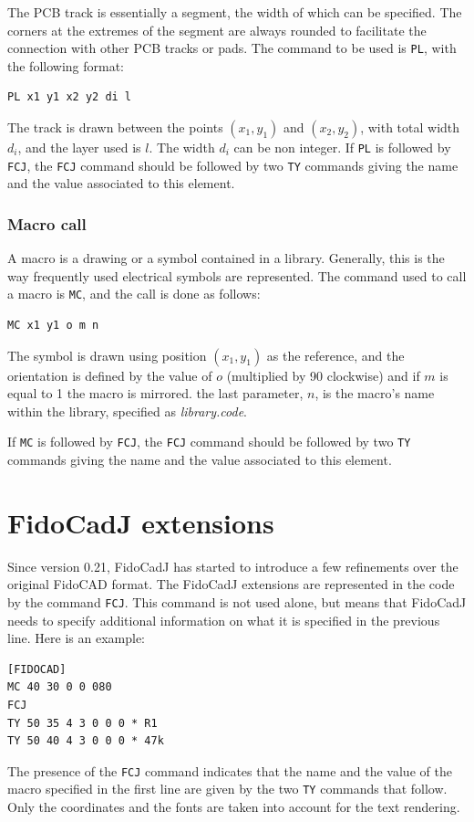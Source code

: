 \documentclass[10pt,a4paper,twoside]{scrreprt}
\begin{document}
The PCB track is essentially a segment, the width
of which can be specified. The corners at the extremes of the segment
are always rounded to facilitate the connection with other PCB tracks
or pads. The command to be used is \lstinline!PL!, with
the following format:
\begin{lstlisting}
PL x1 y1 x2 y2 di l
\end{lstlisting}
The track is drawn between the points $(x_{1},y_{1})$ and $(x_{2},y_{2})$,
with total width $d_{i}$, and the layer used is $l$. The width $d_{i}$ can be non integer.
If \lstinline!PL! is followed by \lstinline!FCJ!, the \lstinline!FCJ! command should be followed by two \lstinline!TY! commands giving the name and the value associated to this element.

\subsubsection{Macro call}

A macro is a drawing or a symbol contained in a library.
Generally, this is the way frequently used electrical symbols are
represented. The command used to call a macro is \lstinline!MC!,
and the call is done as follows:
\begin{lstlisting}
MC x1 y1 o m n
\end{lstlisting}
The symbol is drawn using position $(x_{1},y_{1})$
as the reference, and the orientation is defined by the value of $o$
(multiplied by 90\textdegree{} clockwise) and if $m$ is equal to 1 the macro
is mirrored. the last parameter, $n$, is the macro's name within
the library, specified as \emph{library.code}.

If \lstinline!MC! is followed by \lstinline!FCJ!, the \lstinline!FCJ! command should be followed by two \lstinline!TY! commands giving the name and the value associated to this element.

\section{FidoCadJ extensions}
\label{FCJ_extension}
Since version 0.21, FidoCadJ has started to introduce a few refinements over the original FidoCAD format. The FidoCadJ extensions are represented in the code by the command \lstinline!FCJ!. This command is not used alone, but means that FidoCadJ needs to specify additional information on what it is specified in the previous line.
Here is an example:
\begin{lstlisting}
[FIDOCAD]
MC 40 30 0 0 080
FCJ
TY 50 35 4 3 0 0 0 * R1
TY 50 40 4 3 0 0 0 * 47k
\end{lstlisting}
The presence of the \lstinline!FCJ! command indicates that the name and the value of the macro specified in the first line are given by the two \lstinline!TY! commands that follow. Only the coordinates and the fonts are taken into account for the text rendering.
\end{document}

